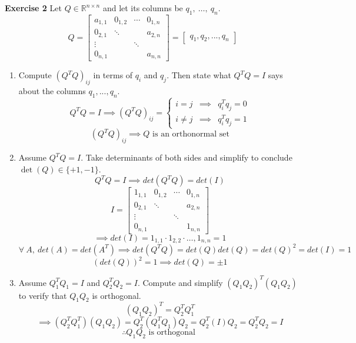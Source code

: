 \documentclass[9pt]{article}
\theoremstyle{plain}
\begin{document}
\vspace{0.5cm}

\noindent \textbf{Exercise 2} Let $Q\in\mathbb{R}^{n\times n}$ and let its columns be $q_{1},~ \hdots, ~q_{n}.$
\[
	Q =
	\begin{bmatrix}
		a_{1,1} & 0_{1,2} & \cdots & 0_{1,n} \\
		0_{2,1} & \ddots  &        & a_{2,n} \\
		\vdots  &         & \ddots &         \\
		0_{n,1} &         &        & a_{n,n}
	\end{bmatrix}
	= \begin{bmatrix}
		q_1, q_2, ..., q_n
	\end{bmatrix}
\]

\begin{enumerate}
	\item[(a)] Compute $(Q^{T}Q)_{ij}$ in terms of $q_{i}$ and $q_{j}$. Then state what $Q^{T}Q=I$ says about the columns $q_{1},...,q_{n}$.
	      \[
		      Q^TQ = I \implies (Q^{T}Q)_{ij} =
		      \left \{
		      \begin{array}{cccc}
			      i=j      & \implies & q_i^T q_j = 0 \\
			      i \neq j & \implies & q_i^T q_j = 1
		      \end{array}
		      \right .
	      \]
	      \[
		      (Q^{T}Q)_{ij} \implies Q \text{ is an orthonormal set}
	      \]
	\item[(b)] Assume $Q^{T}Q=I$. Take determinants of both sides and simplify to conclude $\det(Q)\in\{+1,-1\}$.
	      \[ Q^TQ=I \implies det(Q^TQ)=det(I) \]
	      \[
		      I =
		      \begin{bmatrix}
			      1_{1,1} & 0_{1,2} & \cdots & 0_{1,n} \\
			      0_{2,1} & \ddots  &        & a_{2,n} \\
			      \vdots  &         & \ddots &         \\
			      0_{n,1} &         &        & 1_{n,n}
		      \end{bmatrix}
	      \]
	      \[
		      \implies det(I) = 1_{1,1} \cdot 1_{2,2} \cdot \hdots, 1_{n,n} = 1
	      \]
	      \[
		      \forall ~A, ~det(A) = det(A^T) \implies det(Q^TQ) = det(Q)det(Q) = det(Q)^2 = det(I) = 1
	      \]
	      \[
		      (det(Q))^2 = 1 \implies det(Q) = \pm 1
	      \]

	\item[(c)] Assume $Q_{1}^{T}Q_{1}=I$ and $Q_{2}^{T}Q_{2}=I.$ Compute and simplify $(Q_{1}Q_{2})^{T}(Q_{1}Q_{2})$ to verify that $Q_{1}Q_{2}$ is orthogonal.
	      \[
		      (Q_1Q_2)^T = Q_2^TQ_1^T
	      \]
	      \[
		      \implies (Q_2^TQ_1^T)(Q_1Q_2) = Q_2^T(Q_1^TQ_1)Q_2 = Q_2^T(I)Q_2 = Q_2^TQ_2 = I
	      \]
	      \[
		      \therefore Q_1Q_2 \text{ is orthogonal }
	      \]
\end{enumerate}
\end{document}
